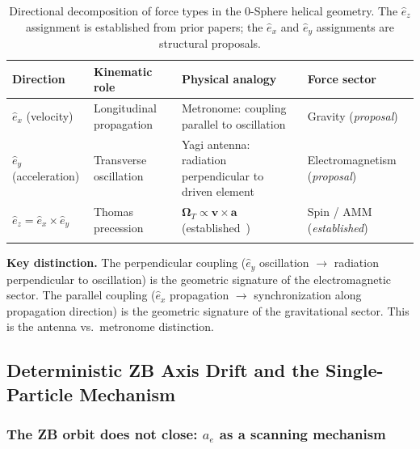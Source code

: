 \documentclass[12pt,letterpaper]{article}
\newcommand{\OmT}{\boldsymbol{\Omega}_T}
\newcommand{\ehat}[1]{\hat{e}_{#1}}
\begin{document}
\begin{table}[h!]
\centering
\renewcommand{\arraystretch}{1.4}
\begin{tabular}{p{3.5cm}p{3.5cm}p{4.5cm}p{3.5cm}}
\toprule
\textbf{Direction} & \textbf{Kinematic role} & \textbf{Physical analogy} & \textbf{Force sector} \\
\midrule
$\ehat{x}$ (velocity)
& Longitudinal propagation
& Metronome: coupling parallel to oscillation~\cite{hanamura34}
& Gravity (\emph{proposal}) \\
\addlinespace[0.3cm]
$\ehat{y}$ (acceleration)
& Transverse oscillation
& Yagi antenna: radiation perpendicular to driven element
& Electromagnetism (\emph{proposal}) \\
\addlinespace[0.3cm]
$\ehat{z} = \ehat{x}\times\ehat{y}$
& Thomas precession
& $\OmT\propto\mathbf{v}\times\mathbf{a}$ (established~\cite{hanamura19})
& Spin / AMM (\emph{established}) \\
\addlinespace[0.2cm]
\bottomrule
\end{tabular}
\caption{Directional decomposition of force types in the 0-Sphere helical geometry. The $\ehat{z}$ assignment is established from prior papers; the $\ehat{x}$ and $\ehat{y}$ assignments are structural proposals.}
\label{tab:directional}
\end{table}

\begin{mdframed}[style=orangebox]
\textbf{Key distinction.} The perpendicular coupling ($\ehat{y}$ oscillation $\to$ radiation perpendicular to oscillation) is the geometric signature of the electromagnetic sector. The parallel coupling ($\ehat{x}$ propagation $\to$ synchronization along propagation direction) is the geometric signature of the gravitational sector. This is the antenna vs.\ metronome distinction.
\end{mdframed}

\subsection{Deterministic ZB Axis Drift and the Single-Particle Mechanism}
\label{subsec:axis_drift}

\subsubsection{The ZB orbit does not close: $a_e$ as a scanning mechanism}
\end{document}
